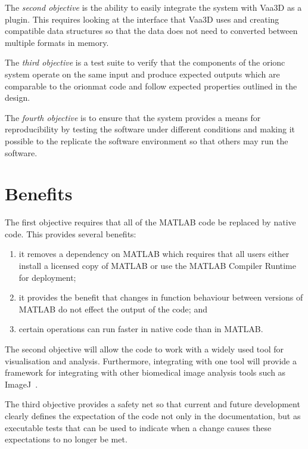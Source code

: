 The \emph{second objective} is the ability to easily integrate the system with
Vaa3D as a plugin. This requires looking at the interface that
Vaa3D uses and creating compatible data structures so that the
data does not need to converted between multiple formats in
memory.

The \emph{third objective} is a test suite to verify that the
components of the \gls{orionc} system operate on the same input
and produce expected outputs which are comparable to the
\gls{orionmat} code and follow expected properties outlined in the
design.

The \emph{fourth objective} is to ensure that the system provides
a means for reproducibility by testing the software under different
conditions and making it possible to the replicate the software
environment so that others may run the software.

\section{Benefits}\label{sec:benefits}

The first objective requires that all of the MATLAB code be
replaced by native code. This provides several benefits:
\begin{enumerate}[label={\alph*)}]
	\item it removes a dependency on MATLAB which requires that
		all users either install a licensed copy of MATLAB
		or use the MATLAB Compiler Runtime for deployment;
	\item it provides the benefit that changes in
		function behaviour between versions of
		MATLAB do not effect the output of the
		code; and
	\item certain operations can run faster in native code than
		in MATLAB.
\end{enumerate}

The second objective will allow the code to work with a widely used
tool for visualisation and analysis. Furthermore, integrating with
one tool will provide a framework for integrating with other
biomedical image analysis tools such as ImageJ~\autocite{Schneider2012}.

The third objective provides a safety net so that current and
future development clearly defines the expectation of the code
not only in the documentation, but as executable tests that can be
used to indicate when a change causes these expectations to no
longer be met.

